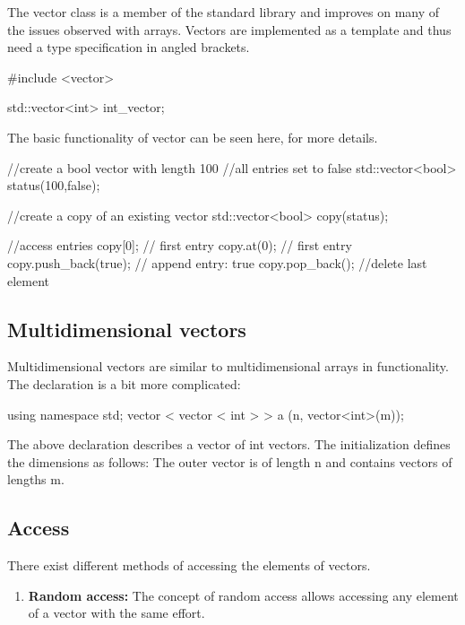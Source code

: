 \documentclass[10pt,a4paper]{scrartcl}
\begin{document}
\begin{multicols*}{2}
The vector class is a member of the standard library and improves on many of the issues observed with arrays. Vectors are implemented as a template and thus need a type specification in angled brackets.

\begin{TPCpp}
#include <vector>

std::vector<int> int_vector;
\end{TPCpp}

The basic functionality of vector can be seen here,  for more details.

\begin{TPCpp}
//create a bool vector with length 100
//all entries set to false
std::vector<bool> status(100,false);

//create a copy of an existing vector
std::vector<bool> copy(status);

//access entries
copy[0]; // first entry
copy.at(0); // first entry
copy.push_back(true); // append entry: true
copy.pop_back(); //delete last element
\end{TPCpp}

\subsection{Multidimensional vectors}

Multidimensional vectors are similar to multidimensional arrays in functionality. The declaration is a bit more complicated:

\begin{TPCpp}
using namespace std;
vector < vector < int > > a (n, vector<int>(m));
\end{TPCpp}

The above declaration describes a vector of int vectors. The initialization defines the dimensions as follows: The outer vector is of length n and contains vectors of lengths m.

\subsection{Access}

There exist different methods of accessing the elements of vectors.

\begin{enumerate}
\item \textbf{Random access:} The concept of random access allows accessing any element of a vector with the same effort.


\end{enumerate}
\end{multicols*}
\end{document}
